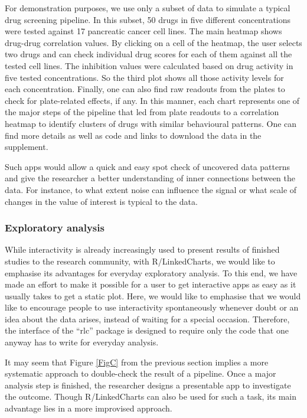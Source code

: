 \documentclass[twocolumn,10pt]{article}
\begin{document}
For demonstration purposes, we use only a subset of data to simulate a typical drug screening pipeline. In this subset, 50 drugs in five different concentrations were tested against 17 pancreatic cancer cell lines. The main heatmap shows drug-drug correlation values. By clicking on a cell of the heatmap, the user selects two drugs and can check individual drug scores for each of them against all the tested cell lines. The inhibition values were calculated based on drug activity in five tested concentrations. So the third plot shows all those activity levels for each concentration. Finally, one can also find raw readouts from the plates to check for plate-related effects, if any. In this manner, each chart represents one of the major steps of the pipeline that led from plate readouts to a correlation heatmap to identify clusters of drugs with similar behavioural patterns. One can find more details as well as code and links to download the data in the supplement. 

Such apps would allow a quick and easy spot check of uncovered data patterns and give the researcher a better understanding of inner connections between the data. For instance, to what extent noise can influence the signal or what scale of changes in the value of interest is typical to the data.

\subsubsection{Exploratory analysis}

While interactivity is already increasingly used to present results of finished studies to the research community, with R/LinkedCharts, we would like to emphasise its advantages for everyday exploratory analysis. To this end, we have made an effort to make it possible for a user to get interactive apps as easy as it usually takes to get a static plot. Here, we would like to emphasise that we would like to encourage people to use interactivity spontaneously whenever doubt or an idea about the data arises, instead of waiting for a special occasion. Therefore, the interface of the ``rlc'' package is designed to require only the code that one anyway has to write for everyday analysis.

It may seem that Figure \ref{FigC} from the previous section implies a more systematic approach to double-check the result of a pipeline. Once a major analysis step is finished, the researcher designs a presentable app to investigate the outcome. Though R/LinkedCharts can also be used for such a task, its main advantage lies in a more improvised approach.
\end{document}
